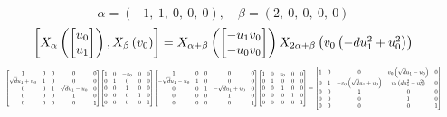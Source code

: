 \documentclass[11pt]{article}
\theoremstyle{definition}
\begin{document}
\[
\alpha = \left( -1, \  1, \  0, \  0, \  0\right), \quad \beta = \left( 2, \  0, \  0, \  0, \  0\right)
\]
\[
\scaletoalign{\textwidth}{\left[ X_{\alpha}\left(\left[\begin{matrix}u_{0}\\u_{1}\end{matrix}\right]\right), X_{\beta}\left(v_{0}\right) \right] = X_{\alpha + \beta}\left(\left[\begin{matrix}- u_{1} v_{0}\\- u_{0} v_{0}\end{matrix}\right]\right) X_{2\alpha + \beta}\left(v_{0} \left(- d u_{1}^{2} + u_{0}^{2}\right)\right)}
\]
\[
\scaletoalign{\textwidth}{{\left[\begin{matrix}1 & 0 & 0 & 0 & 0\\\sqrt{d} u_{1} + u_{0} & 1 & 0 & 0 & 0\\0 & 0 & 1 & \sqrt{d} u_{1} - u_{0} & 0\\0 & 0 & 0 & 1 & 0\\0 & 0 & 0 & 0 & 1\end{matrix}\right]} {\left[\begin{matrix}1 & 0 & - v_{0} & 0 & 0\\0 & 1 & 0 & 0 & 0\\0 & 0 & 1 & 0 & 0\\0 & 0 & 0 & 1 & 0\\0 & 0 & 0 & 0 & 1\end{matrix}\right]} {\left[\begin{matrix}1 & 0 & 0 & 0 & 0\\- \sqrt{d} u_{1} - u_{0} & 1 & 0 & 0 & 0\\0 & 0 & 1 & - \sqrt{d} u_{1} + u_{0} & 0\\0 & 0 & 0 & 1 & 0\\0 & 0 & 0 & 0 & 1\end{matrix}\right]} {\left[\begin{matrix}1 & 0 & v_{0} & 0 & 0\\0 & 1 & 0 & 0 & 0\\0 & 0 & 1 & 0 & 0\\0 & 0 & 0 & 1 & 0\\0 & 0 & 0 & 0 & 1\end{matrix}\right]} = {\left[\begin{matrix}1 & 0 & 0 & v_{0} \left(\sqrt{d} u_{1} - u_{0}\right) & 0\\0 & 1 & - v_{0} \left(\sqrt{d} u_{1} + u_{0}\right) & v_{0} \left(d u_{1}^{2} - u_{0}^{2}\right) & 0\\0 & 0 & 1 & 0 & 0\\0 & 0 & 0 & 1 & 0\\0 & 0 & 0 & 0 & 1\end{matrix}\right]}}
\]
\end{document}
